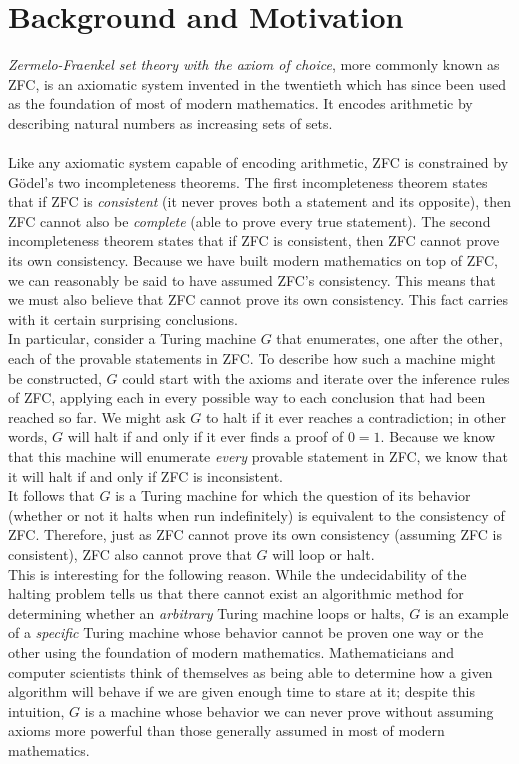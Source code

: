 \documentclass[11pt]{report}
\begin{document}
\section{Background and Motivation \label{sec:background}}

\emph{Zermelo-Fraenkel set theory with the axiom of choice}, more commonly known as ZFC, is an axiomatic system invented in the twentieth which has since been used as the foundation of most of modern mathematics. It encodes arithmetic by describing natural numbers as increasing sets of sets. \\
\\
Like any axiomatic system capable of encoding arithmetic, ZFC is constrained by G\"{o}del's two incompleteness theorems. The first incompleteness theorem states that if ZFC is \emph{consistent} (it never proves both a statement and its opposite), then ZFC cannot also be \emph{complete} (able to prove every true statement). The second incompleteness theorem states that if ZFC is consistent, then ZFC cannot prove its own consistency. Because we have built modern mathematics on top of ZFC, we can reasonably be said to have assumed ZFC's consistency. This means that we must also believe that ZFC cannot prove its own consistency. This fact carries with it certain surprising conclusions. \\

In particular, consider a Turing machine $G$ that enumerates, one after the other, each of the provable statements in ZFC. To describe how such a machine might be constructed, $G$ could start with the axioms and iterate over the inference rules of ZFC, applying each in every possible way to each conclusion that had been reached so far. We might ask $G$ to halt if it ever reaches a contradiction; in other words, $G$ will halt if and only if it ever finds a proof of $0 = 1$. Because we know that this machine will enumerate \emph{every} provable statement in ZFC, we know that it will halt if and only if ZFC is inconsistent. \\

It follows that $G$ is a Turing machine for which the question of its behavior (whether or not it halts when run indefinitely) is equivalent to the consistency of ZFC. Therefore, just as ZFC cannot prove its own consistency (assuming ZFC is consistent), ZFC also cannot prove that $G$ will loop or halt. \\

This is interesting for the following reason. While the undecidability of the halting problem tells us that there cannot exist an algorithmic method for determining whether an \emph{arbitrary} Turing machine loops or halts, $G$ is an example of a \emph{specific} Turing machine whose behavior cannot be proven one way or the other using the foundation of modern mathematics. Mathematicians and computer scientists think of themselves as being able to determine how a given algorithm will behave if we are given enough time to stare at it; despite this intuition, $G$ is a machine whose behavior we can never prove without assuming axioms more powerful than those generally assumed in most of modern mathematics. \\
\end{document}
